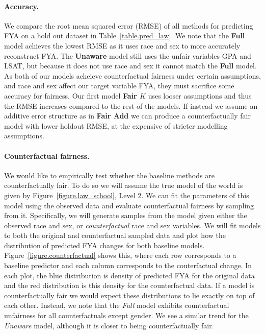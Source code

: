 \paragraph{Accuracy.}
We compare the root mean squared error (RMSE) of all methods for predicting FYA on a hold out dataset in Table~\ref{table.pred_law}.  We note that the \textbf{Full} model achieves the lowest RMSE as it uses race and sex to more accurately reconstruct FYA. The \textbf{Unaware} model still uses the unfair variables GPA and LSAT, but because it does not use race and sex it cannot match the \textbf{Full} model. As both of our models acheieve counterfactual fairness under certain assumptions, and race and sex affect our target variable FYA, they must sacrifice some accuracy for fairness. Our first model \textbf{Fair $K$} uses looser assumptions and thus the RMSE increases compared to the rest of the models. If instead we assume an additive error structure as in \textbf{Fair Add} we can produce a counterfactually fair model with lower holdout RMSE, at the expensive of stricter modelling assumptions.


\paragraph{Counterfactual fairness.}
We would like to empirically test whether the baseline methods are counterfactually fair. To do so we will assume the true model of the world is given by Figure~\ref{figure.law_school}, Level 2. We can fit the parameters of this model using the observed data and evaluate counterfactual fairness by sampling from it. Specifically, we will generate samples from the model given either the observed race and sex, or \emph{counterfactual} race and sex variables. We will fit models to both the original and counterfactual sampled data and plot how the distribution of predicted FYA changes for both baseline models. Figure~\ref{figure.counterfactual} shows this, where each row corresponds to a baseline predictor and each column corresponds to the couterfactual change. In each plot, the blue distribution is density of predicted FYA for the original data and the red distribution is this density for the counterfactual data. If a model is counterfactually fair we would expect these distributions to lie exactly on top of each other. Instead, we note that the \emph{Full} model exhibits counterfactual unfairness for all counterfactuals except gender. We see a similar trend for the \emph{Unaware} model, although it is closer to being counterfactually fair.

